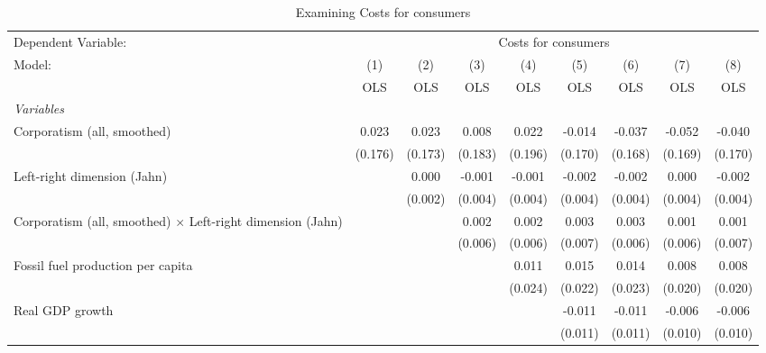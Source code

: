 
\begin{table}[htbp]
   \caption{Examining Costs for consumers}
   \centering
   \begin{tabular}{lcccccccc}
      \toprule
      Dependent Variable: & \multicolumn{8}{c}{Costs for consumers}\\
      Model:                                                            & (1)     & (2)     & (3)     & (4)     & (5)     & (6)     & (7)     & (8)\\  
                                                                        &  OLS    & OLS     & OLS     & OLS     & OLS     & OLS     & OLS     & OLS\\  
      \midrule
      \emph{Variables}\\
      Corporatism (all, smoothed)                                       & 0.023   & 0.023   & 0.008   & 0.022   & -0.014  & -0.037  & -0.052  & -0.040\\   
                                                                        & (0.176) & (0.173) & (0.183) & (0.196) & (0.170) & (0.168) & (0.169) & (0.170)\\   
      Left-right dimension (Jahn)                                       &         & 0.000   & -0.001  & -0.001  & -0.002  & -0.002  & 0.000   & -0.002\\   
                                                                        &         & (0.002) & (0.004) & (0.004) & (0.004) & (0.004) & (0.004) & (0.004)\\   
      Corporatism (all, smoothed) $\times$ Left-right dimension (Jahn)  &         &         & 0.002   & 0.002   & 0.003   & 0.003   & 0.001   & 0.001\\   
                                                                        &         &         & (0.006) & (0.006) & (0.007) & (0.006) & (0.006) & (0.007)\\   
      Fossil fuel production per capita                                 &         &         &         & 0.011   & 0.015   & 0.014   & 0.008   & 0.008\\   
                                                                        &         &         &         & (0.024) & (0.022) & (0.023) & (0.020) & (0.020)\\   
      Real GDP growth                                                   &         &         &         &         & -0.011  & -0.011  & -0.006  & -0.006\\   
                                                                        &         &         &         &         & (0.011) & (0.011) & (0.010) & (0.010)\\   

\end{tabular}
\end{table}
